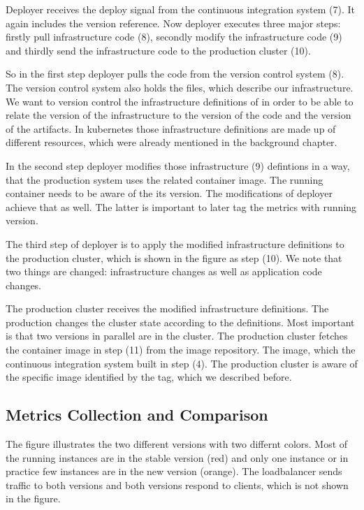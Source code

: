 Deployer receives the deploy signal from the continuous integration system (7). It again
includes the version reference. Now deployer executes three major steps: firstly pull
infrastructure code (8), secondly modify the infrastructure code (9) and thirdly send the
infrastructure code to the production cluster (10).

So in the first step deployer pulls the code from the version control system (8). The
version control system also holds the files, which describe our infrastructure. We want to
version control the infrastructure definitions of in order to be able to relate the
version of the infrastructure to the version of the code and the version of the
artifacts. In kubernetes those infrastructure definitions are made up of different
resources, which were already mentioned in the background chapter.

In the second step deployer modifies those infrastructure (9) defintions in a way, that
the production system uses the related container image. The running container needs to be
aware of the its version. The modifications of deployer achieve that as well. The latter
is important to later tag the metrics with running version.

The third step of deployer is to apply the modified infrastructure definitions to the
production cluster, which is shown in the figure as step (10). We note that two things are
changed: infrastructure changes as well as application code changes.

The production cluster receives the modified infrastructure definitions. The production
changes the cluster state according to the definitions. Most important is that two
versions in parallel are in the cluster. The production cluster fetches the container
image in step (11) from the image repository. The image, which the continuous integration
system built in step (4). The production cluster is aware of the specific image identified
by the tag, which we described before.

\subsection{Metrics Collection and Comparison}

The figure illustrates the two different versions with two differnt colors. Most of the
running instances are in the stable version (red) and only one instance or in practice few
instances are in the new version (orange). The loadbalancer sends traffic to both versions
and both versions respond to clients, which is not shown in the figure.


